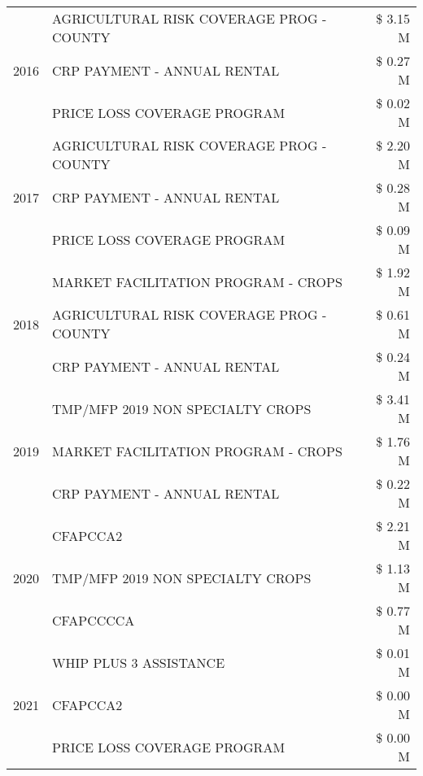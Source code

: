 \begin{tabular}{llr}
\cline{1-3}
\multirow[t]{3}{*}{2016} & AGRICULTURAL RISK COVERAGE PROG - COUNTY & \$ 3.15 M \\
 & CRP PAYMENT - ANNUAL RENTAL & \$ 0.27 M \\
 & PRICE LOSS COVERAGE PROGRAM & \$ 0.02 M \\
\cline{1-3}
\multirow[t]{3}{*}{2017} & AGRICULTURAL RISK COVERAGE PROG - COUNTY & \$ 2.20 M \\
 & CRP PAYMENT - ANNUAL RENTAL & \$ 0.28 M \\
 & PRICE LOSS COVERAGE PROGRAM & \$ 0.09 M \\
\cline{1-3}
\multirow[t]{3}{*}{2018} & MARKET FACILITATION PROGRAM - CROPS & \$ 1.92 M \\
 & AGRICULTURAL RISK COVERAGE PROG - COUNTY & \$ 0.61 M \\
 & CRP PAYMENT - ANNUAL RENTAL & \$ 0.24 M \\
\cline{1-3}
\multirow[t]{3}{*}{2019} & TMP/MFP 2019 NON SPECIALTY CROPS & \$ 3.41 M \\
 & MARKET FACILITATION PROGRAM - CROPS & \$ 1.76 M \\
 & CRP PAYMENT - ANNUAL RENTAL & \$ 0.22 M \\
\cline{1-3}
\multirow[t]{3}{*}{2020} & CFAPCCA2 & \$ 2.21 M \\
 & TMP/MFP 2019 NON SPECIALTY CROPS & \$ 1.13 M \\
 & CFAPCCCCA & \$ 0.77 M \\
\cline{1-3}
\multirow[t]{3}{*}{2021} & WHIP PLUS 3 ASSISTANCE & \$ 0.01 M \\
 & CFAPCCA2 & \$ 0.00 M \\
 & PRICE LOSS COVERAGE PROGRAM & \$ 0.00 M \\
\cline{1-3}
\bottomrule
\end{tabular}
